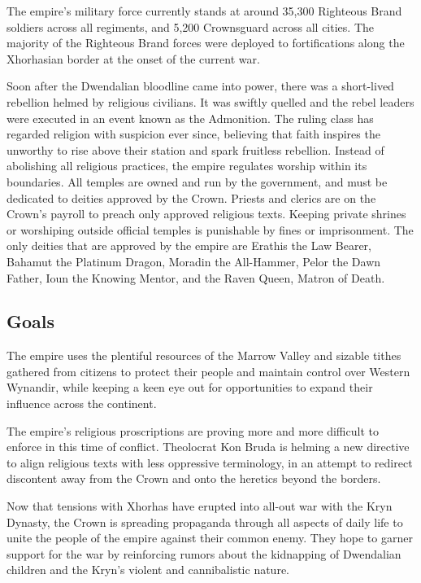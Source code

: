 \documentclass[10pt,a4paper,twoside,bg=print,twocolumn,openany,nodeprecatedcode]{dndbook}
\begin{document}
The empire's military force currently stands at around 35,300 Righteous Brand soldiers across all regiments, and 5,200 Crownsguard across all cities. The majority of the Righteous Brand forces were deployed to fortifications along the Xhorhasian border at the onset of the current war.

Soon after the Dwendalian bloodline came into power, there was a short-lived rebellion helmed by religious civilians. It was swiftly quelled and the rebel leaders were executed in an event known as the Admonition. The ruling class has regarded religion with suspicion ever since, believing that faith inspires the unworthy to rise above their station and spark fruitless rebellion. Instead of abolishing all religious practices, the empire regulates worship within its boundaries. All temples are owned and run by the government, and must be dedicated to deities approved by the Crown. Priests and clerics are on the Crown's payroll to preach only approved religious texts. Keeping private shrines or worshiping outside official temples is punishable by fines or imprisonment. The only deities that are approved by the empire are Erathis the Law Bearer, Bahamut the Platinum Dragon, Moradin the All-Hammer, Pelor the Dawn Father, Ioun the Knowing Mentor, and the Raven Queen, Matron of Death.

\subsection{Goals}
The empire uses the plentiful resources of the Marrow Valley and sizable tithes gathered from citizens to protect their people and maintain control over Western Wynandir, while keeping a keen eye out for opportunities to expand their influence across the continent.

The empire's religious proscriptions are proving more and more difficult to enforce in this time of conflict. Theolocrat Kon Bruda is helming a new directive to align religious texts with less oppressive terminology, in an attempt to redirect discontent away from the Crown and onto the heretics beyond the borders.

Now that tensions with Xhorhas have erupted into all-out war with the Kryn Dynasty, the Crown is spreading propaganda through all aspects of daily life to unite the people of the empire against their common enemy. They hope to garner support for the war by reinforcing rumors about the kidnapping of Dwendalian children and the Kryn's violent and cannibalistic nature.
\end{document}

